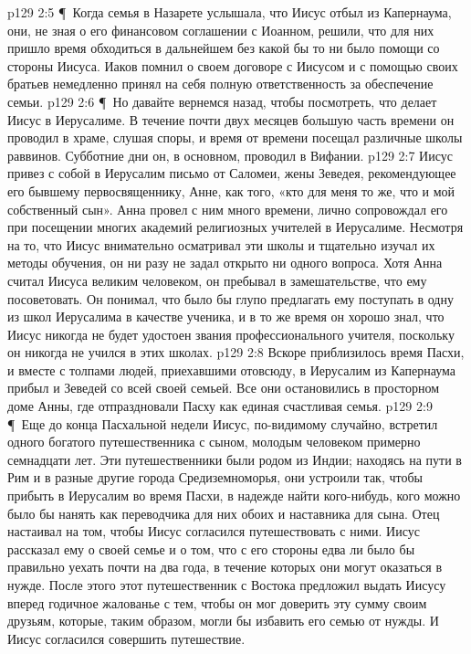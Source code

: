 \vs p129 2:5 \P\ Когда семья в Назарете услышала, что Иисус отбыл из Капернаума, они, не зная о его финансовом соглашении с Иоанном, решили, что для них пришло время обходиться в дальнейшем без какой бы то ни было помощи со стороны Иисуса. Иаков помнил о своем договоре с Иисусом и с помощью своих братьев немедленно принял на себя полную ответственность за обеспечение семьи.
\vs p129 2:6 \P\ Но давайте вернемся назад, чтобы посмотреть, что делает Иисус в Иерусалиме. В течение почти двух месяцев большую часть времени он проводил в храме, слушая споры, и время от времени посещал различные школы раввинов. Субботние дни он, в основном, проводил в Вифании.
\vs p129 2:7 Иисус привез с собой в Иерусалим письмо от Саломеи, жены Зеведея, рекомендующее его бывшему первосвященнику, Анне, как того, «кто для меня то же, что и мой собственный сын». Анна провел с ним много времени, лично сопровождал его при посещении многих академий религиозных учителей в Иерусалиме. Несмотря на то, что Иисус внимательно осматривал эти школы и тщательно изучал их методы обучения, он ни разу не задал открыто ни одного вопроса. Хотя Анна считал Иисуса великим человеком, он пребывал в замешательстве, что ему посоветовать. Он понимал, что было бы глупо предлагать ему поступать в одну из школ Иерусалима в качестве ученика, и в то же время он хорошо знал, что Иисус никогда не будет удостоен звания профессионального учителя, поскольку он никогда не учился в этих школах.
\vs p129 2:8 Вскоре приблизилось время Пасхи, и вместе с толпами людей, приехавшими отовсюду, в Иерусалим из Капернаума прибыл и Зеведей со всей своей семьей. Все они остановились в просторном доме Анны, где отпраздновали Пасху как единая счастливая семья.
\vs p129 2:9 \P\ Еще до конца Пасхальной недели Иисус, по\hyp{}видимому случайно, встретил одного богатого путешественника с сыном, молодым человеком примерно семнадцати лет. Эти путешественники были родом из Индии; находясь на пути в Рим и в разные другие города Средиземноморья, они устроили так, чтобы прибыть в Иерусалим во время Пасхи, в надежде найти кого\hyp{}нибудь, кого можно было бы нанять как переводчика для них обоих и наставника для сына. Отец настаивал на том, чтобы Иисус согласился путешествовать с ними. Иисус рассказал ему о своей семье и о том, что с его стороны едва ли было бы правильно уехать почти на два года, в течение которых они могут оказаться в нужде. После этого этот путешественник с Востока предложил выдать Иисусу вперед годичное жалованье с тем, чтобы он мог доверить эту сумму своим друзьям, которые, таким образом, могли бы избавить его семью от нужды. И Иисус согласился совершить путешествие.
